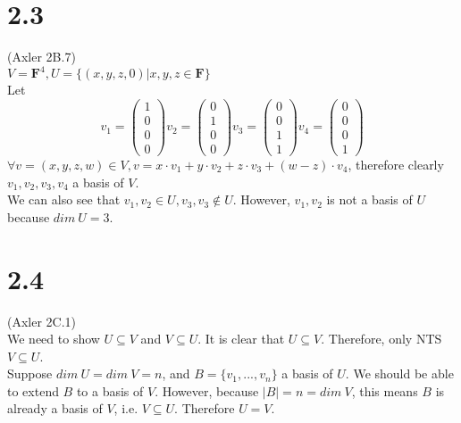 \documentclass{article}
\begin{document}
\section{2.3}
(Axler 2B.7)\\
$V = \textbf{F}^4, U = \{(x, y, z, 0)|x, y, z \in \textbf{F}\}$\\
Let
\begin{equation*}
    v_1 = \begin{pmatrix}
    1\\
    0\\
    0\\
    0
    \end{pmatrix}
    v_2 = \begin{pmatrix}
    0\\
    1\\
    0\\
    0
    \end{pmatrix}
    v_3 = \begin{pmatrix}
    0\\
    0\\
    1\\
    1
    \end{pmatrix}
    v_4 = \begin{pmatrix}
    0\\
    0\\
    0\\
    1
    \end{pmatrix}
\end{equation*}
$\forall v = (x, y, z, w) \in V, v = x \cdot v_1 + y \cdot v_2 + z \cdot v_3 + (w-z) \cdot v_4$, therefore clearly $v_1, v_2, v_3, v_4$ a basis of $V$.\\
We can also see that $v_1, v_2 \in U, v_3, v_3 \notin U$. However, $v_1, v_2$ is not a basis of $U$ because $dim\ U = 3$.
\section{2.4}
(Axler 2C.1)\\
We need to show $U \subseteq V$ and $V \subseteq U$. It is clear that $U \subseteq V$. Therefore, only NTS $V \subseteq U$.\\
Suppose $dim\ U = dim\ V = n$, and $B = \{v_1, ..., v_n\}$ a basis of $U$. We should be able to extend $B$ to a basis of $V$. However, because $|B| = n = dim\ V$, this means $B$ is already a basis of $V$, i.e. $V \subseteq U$. Therefore $U = V$.
\end{document}
